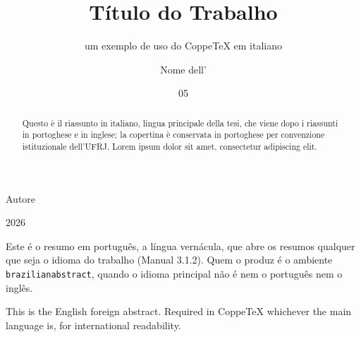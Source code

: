 \documentclass[italian,dsc]{ufrj}
\begin{document}
  \title{Título do Trabalho}
  \subtitle{um exemplo de uso do CoppeTeX em italiano}
  \author{Nome dell'}{Autore}
  \date{05}{2026}
  \maketitle
  \frontmatter
  \begin{brazilianabstract}
    Este é o resumo em português, a língua vernácula, que abre os resumos
    qualquer que seja o idioma do trabalho (Manual 3.1.2). Quem o produz é o
    ambiente \texttt{brazilianabstract}, quando o idioma principal não é nem
    o português nem o inglês.
  \end{brazilianabstract}
  \begin{foreignabstract}
    This is the English foreign abstract. Required in CoppeTeX whichever
    the main language is, for international readability.
  \end{foreignabstract}
  \begin{abstract}
    Questo è il riassunto in italiano, lingua principale della tesi, che
    viene dopo i riassunti in portoghese e in inglese; la copertina è
    conservata in portoghese per convenzione istituzionale dell'UFRJ. Lorem
    ipsum dolor sit amet, consectetur adipiscing elit.
  \end{abstract}
  \tableofcontents
  \mainmatter
\end{document}
